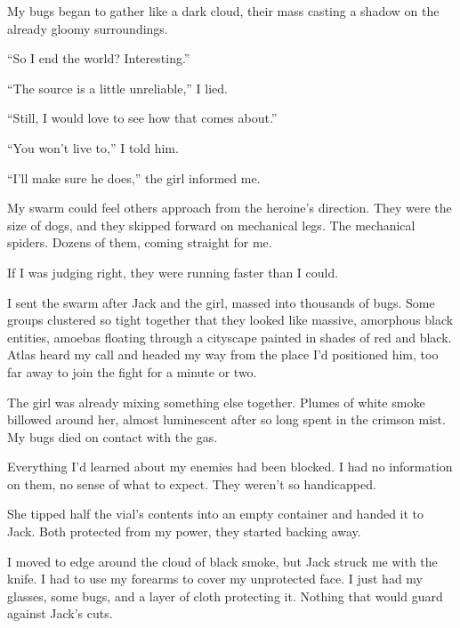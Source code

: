 My bugs began to gather like a dark cloud, their mass casting a shadow on the already gloomy surroundings.



``So I end the world?  Interesting.''



``The source is a little unreliable,'' I lied.



``Still, I would love to see how that comes about.''



``You won't live to,'' I told him.



``I'll make sure he does,'' the girl informed me.



My swarm could feel others approach from the heroine's direction.  They were the size of dogs, and they skipped forward on mechanical legs.  The mechanical spiders.  Dozens of them, coming straight for me.



If I was judging right, they were running faster than I could.



I sent the swarm after Jack and the girl, massed into thousands of bugs.  Some groups clustered so tight together that they looked like massive, amorphous black entities, amoebas floating through a cityscape painted in shades of red and black.  Atlas heard my call and headed my way from the place I'd positioned him, too far away to join the fight for a minute or two.



The girl was already mixing something else together.  Plumes of white smoke billowed around her, almost luminescent after so long spent in the crimson mist.  My bugs died on contact with the gas.



Everything I'd learned about my enemies had been blocked.  I had no information on them, no sense of what to expect.  They weren't so handicapped.



She tipped half the vial's contents into an empty container and handed it to Jack.  Both protected from my power, they started backing away.



I moved to edge around the cloud of black smoke, but Jack struck me with the knife.  I had to use my forearms to cover my unprotected face.  I just had my glasses, some bugs, and a layer of cloth protecting it.  Nothing that would guard against Jack's cuts.



